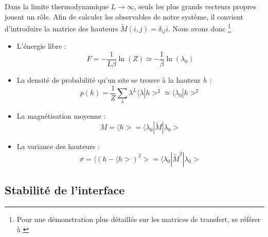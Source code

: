 Dans la limite thermodynamique $L \to \infty$, seuls les plus grands vecteurs propres jouent un rôle. Afin de calculer les observables de notre système, il convient d'introduire la matrice des hauteurs $\tilde{M}(i,j) = \delta_{ij} i$. Nous avons donc \footnote{Pour une démonstration plus détaillée sur les matrices de transfert, se référer à \cite{matrice_transfert}}
\begin{itemize}
	\item L'énergie libre :  
	\begin{equation}
		F =  - \frac{1}{L \beta} \ln(Z) \simeq - \frac{1}{\beta } \ln( \lambda_0)
	\end{equation}
	\item La densité de probabilité qu'un site se trouve à la hauteur $h$ : 
	\begin{equation}
		p(h) = \frac{1}{Z} \sum_\lambda \lambda^L \langle\lambda | h >^2 \simeq \langle \lambda_0 | h >^2
	\end{equation}
	\item La magnétisation moyenne :
	\begin{equation}
		M = \langle h > = \langle \lambda_0 | \tilde{M} | \lambda_0 > 
	\end{equation}
	\item La variance des hauteurs :
	\begin{equation}
		\sigma = \langle (h - \langle h >)^2 > =  \langle \lambda_0 | \tilde{M}^2 | \lambda_0 >
	\end{equation}
\end{itemize}

	\subsection{Stabilité de l'interface}

